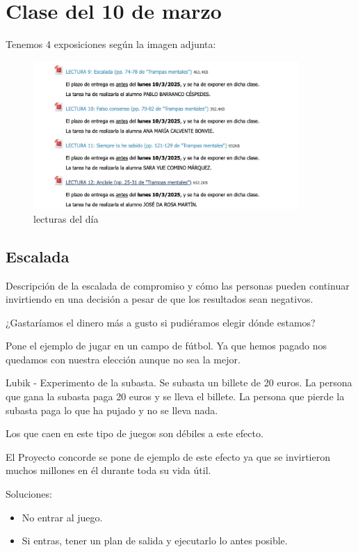 \documentclass[12pt, a4paper, twoside]{article}
\begin{document}
\section{Clase del 10 de marzo}

Tenemos 4 exposiciones según la imagen adjunta:

\begin{figure}[h]
    \centering
    \includegraphics[width=0.9\textwidth]{./images/0310.jpg}
    \caption{lecturas del día}
\end{figure}

\subsection{Escalada}

Descripción de la escalada de compromiso y cómo las personas pueden continuar invirtiendo en una decisión a pesar de que los resultados sean negativos.

¿Gastaríamos el dinero más a gusto si pudiéramos elegir dónde estamos?

Pone el ejemplo de jugar en un campo de fútbol. Ya que hemos pagado nos quedamos con nuestra elección
aunque no sea la mejor.

Lubik - Experimento de la subasta. Se subasta un billete de 20 euros. La persona que gana la subasta
paga 20 euros y se lleva el billete. La persona que pierde la subasta paga lo que ha pujado y no se lleva nada.

Los que caen en este tipo de juegos son débiles a este efecto.

El Proyecto concorde se pone de ejemplo de este efecto ya que se invirtieron muchos millones en él durante
toda su vida útil.  


Soluciones:

\begin{itemize}
    \item No entrar al juego.
    \item Si entras, tener un plan de salida y ejecutarlo lo antes posible.

\end{itemize}
\end{document}
